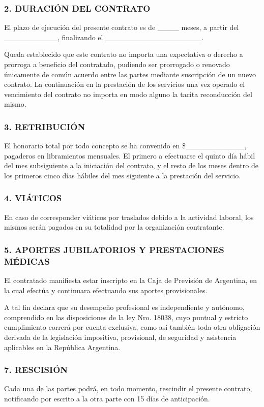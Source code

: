 \subsubsection*{2. DURACIÓN DEL CONTRATO}
El plazo de ejecución del presente contrato es de \_\_\_\_ meses, a partir del \_\_\_\_\_\_\_\_\_\_, finalizando el \_\_\_\_\_\_\_\_\_\_\_\_\_\_\_\_\_\_.

Queda establecido que este contrato no importa una expectativa o derecho a prorroga a beneficio del contratado, pudiendo ser prorrogado o renovado únicamente de común acuerdo entre las partes mediante suscripción de un nuevo contrato. La continuación en la prestación de los servicios una vez operado el vencimiento del contrato no importa en modo alguno la tacita reconducción del mismo.

\subsubsection*{3. RETRIBUCIÓN}
El honorario total por todo concepto se ha convenido en \$\_\_\_\_\_\_\_\_\_\_\_, pagaderos en libramientos mensuales. El primero a efectuarse el quinto día hábil del mes subsiguiente a la iniciación del contrato, y el resto de los meses dentro de los primeros cinco días hábiles del mes siguiente a la prestación del servicio.

\subsubsection*{4. VIÁTICOS}
En caso de corresponder viáticos por traslados debido a la actividad laboral, los mismos serán pagados en su totalidad por la organización contratante.

\subsubsection*{5. APORTES JUBILATORIOS Y PRESTACIONES MÉDICAS}
El contratado manifiesta estar inscripto en la Caja de Previsión de Argentina, en la cual efectúa y continuara efectuando sus aportes provisionales.

A tal fin declara que su desempeño profesional es independiente y autónomo, comprendido en las disposiciones de la ley Nro. 18038, cuyo puntual y estricto cumplimiento correrá por cuenta exclusiva, como así también toda otra obligación derivada de la legislación impositiva, provisional, de seguridad y asistencia aplicables en la República Argentina.

\subsubsection*{7. RESCISIÓN}
Cada una de las partes podrá, en todo momento, rescindir el presente contrato, notificando por escrito a la otra parte con 15 días de anticipación.


